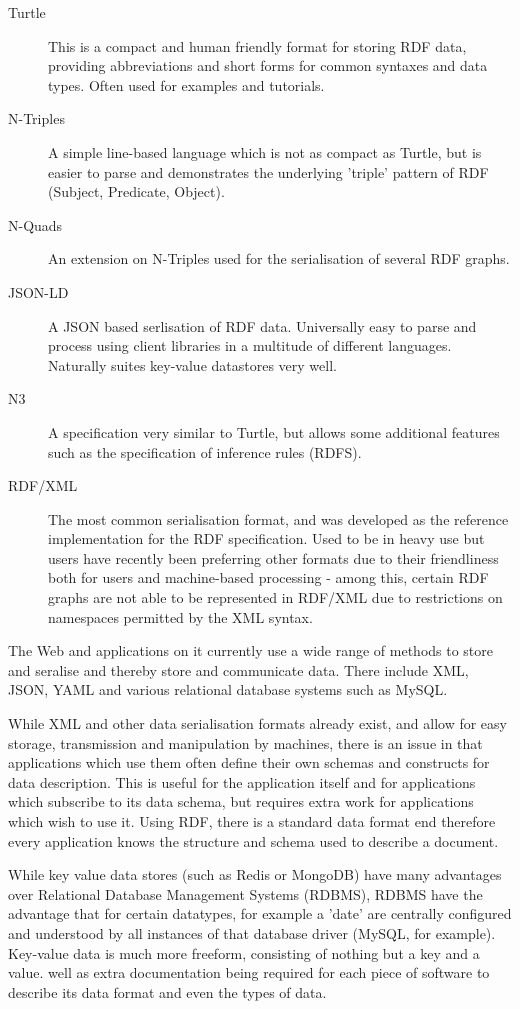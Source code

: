 \documentclass{article}
\begin{document}
\begin{description}
    \item[Turtle] This is a compact and human friendly format for storing RDF
    data, providing abbreviations and short forms for common syntaxes and
    data types. Often used for examples and tutorials.\cite{turtle}
    \item[N-Triples] A simple line-based language which is not as compact as 
    Turtle, but is easier to parse and demonstrates the underlying 'triple'
    pattern of RDF (Subject, Predicate, Object).\cite{ntriples}
    \item[N-Quads] An extension on N-Triples used for the serialisation of
    several RDF graphs.
    \item[JSON-LD] A JSON based serlisation of RDF data. Universally easy to
    parse and process using client libraries in a multitude of different
    languages. Naturally suites key-value datastores very well.
    \item[N3] A specification very similar to Turtle, but allows some additional
    features such as the specification of inference rules (RDFS).
    \item[RDF/XML] The most common serialisation format, and was developed as
    the reference implementation for the RDF specification. Used to be in heavy
    use but users have recently been preferring other formats due to their
    friendliness both for users and machine-based processing - among this,
    certain RDF graphs are not able to be represented in RDF/XML due to
    restrictions on namespaces permitted by the XML syntax.
\end{description}

The Web and applications on it currently use a wide range of methods to store
and seralise and thereby store and communicate data. There include XML, JSON,
YAML and various relational database systems such as MySQL.

While XML and other data serialisation formats already exist, and allow for easy 
storage, transmission and manipulation by machines, there is an issue in that 
applications which use them often define their own schemas and constructs for 
data description. This is useful for the application itself and for applications 
which subscribe to its data schema, but requires extra work for applications which 
wish to use it. Using RDF, there is a standard data format end therefore every
application knows the structure and schema used to describe a document.

While key value data stores (such as Redis or MongoDB) have many advantages over 
Relational Database Management Systems (RDBMS), RDBMS have the advantage that for 
certain datatypes,
for example a 'date' are centrally configured and understood by all instances of
that database driver (MySQL, for example). Key-value data is much more freeform,
consisting of nothing but a key and a value. 
well as extra documentation being required for each piece of software to
describe its data format and even the types of data. 
\end{document}
